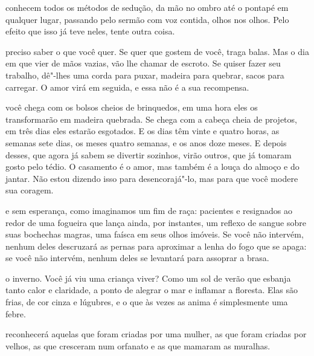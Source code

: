 \pagebreak
\thispagestyle{empty}


\movetooddpage

 conhecem todos os métodos de sedução, da mão no ombro até o pontapé
em qualquer lugar, passando pelo sermão com voz contida, olhos nos
olhos. Pelo efeito que isso já teve neles, tente outra coisa.

\bigskip
\bigskip


 preciso saber o que você quer. Se quer que gostem de você, traga
balas. Mas o dia em que vier de mãos vazias, vão lhe chamar de escroto.
Se quiser fazer seu trabalho, dê"-lhes uma corda para puxar, madeira para
quebrar, sacos para carregar. O amor virá em seguida, e essa não é a sua
recompensa.

\bigskip
\bigskip


 você chega com os bolsos cheios de brinquedos, em uma hora eles os
transformarão em madeira quebrada. Se chega com a cabeça cheia de
projetos, em três dias eles estarão esgotados. E os dias têm vinte e
quatro horas, as semanas sete dias, os meses quatro semanas, e os anos
doze meses. E depois desses, que agora já sabem se divertir sozinhos,
virão outros, que já tomaram gosto pelo tédio. O casamento é o amor, mas
também é a louça do almoço e do jantar. Não estou dizendo isso para
desencorajá"-lo, mas para que você modere sua coragem.

\bigskip
\bigskip


 e sem esperança, como imaginamos um fim de raça: pacientes e
resignados ao redor de uma fogueira que lança ainda, por instantes, um
reflexo de sangue sobre suas bochechas magras, uma faísca em seus olhos
imóveis. Se você não intervém, nenhum deles descruzará as pernas para
aproximar a lenha do fogo que se apaga: se você não intervém, nenhum
deles se levantará para assoprar a brasa.

\bigskip
\bigskip


 o inverno. Você já viu uma criança viver? Como um sol de verão
que esbanja tanto calor e claridade, a ponto de alegrar o mar e inflamar
a floresta. Elas são frias, de cor cinza e lúgubres, e o que às vezes as
anima é simplesmente uma febre.

\bigskip
\bigskip

 reconhecerá aquelas que foram criadas por uma mulher, as que foram
criadas por velhos, as que cresceram num orfanato e as que mamaram as
muralhas.

\bigskip
\bigskip

